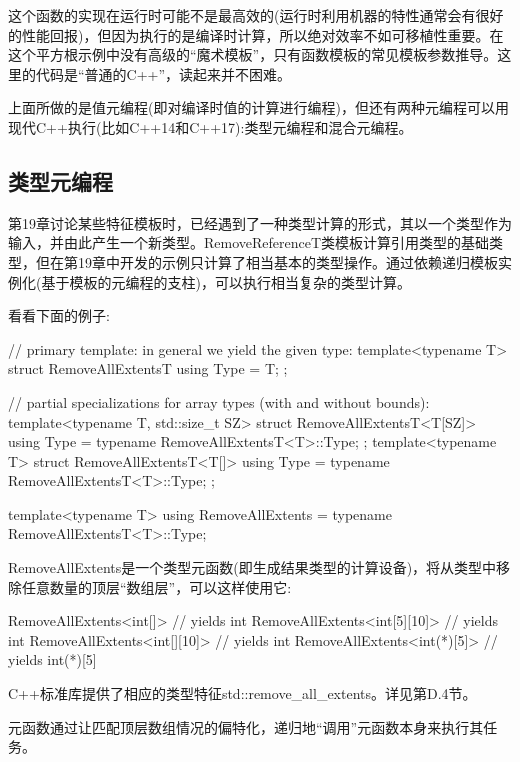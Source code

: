 这个函数的实现在运行时可能不是最高效的(运行时利用机器的特性通常会有很好的性能回报)，但因为执行的是编译时计算，所以绝对效率不如可移植性重要。在这个平方根示例中没有高级的“魔术模板”，只有函数模板的常见模板参数推导。这里的代码是“普通的C++”，读起来并不困难。

上面所做的是值元编程(即对编译时值的计算进行编程)，但还有两种元编程可以用现代C++执行(比如C++14和C++17):类型元编程和混合元编程。

\subsection{类型元编程}

第19章讨论某些特征模板时，已经遇到了一种类型计算的形式，其以一个类型作为输入，并由此产生一个新类型。RemoveReferenceT类模板计算引用类型的基础类型，但在第19章中开发的示例只计算了相当基本的类型操作。通过依赖递归模板实例化(基于模板的元编程的支柱)，可以执行相当复杂的类型计算。

看看下面的例子:

\begin{cpp}
// primary template: in general we yield the given type:
template<typename T>
struct RemoveAllExtentsT {
	using Type = T;
};

// partial specializations for array types (with and without bounds):
template<typename T, std::size_t SZ>
struct RemoveAllExtentsT<T[SZ]> {
	using Type = typename RemoveAllExtentsT<T>::Type;
};
template<typename T>
struct RemoveAllExtentsT<T[]> {
	using Type = typename RemoveAllExtentsT<T>::Type;
};

template<typename T>
using RemoveAllExtents = typename RemoveAllExtentsT<T>::Type;
\end{cpp}

RemoveAllExtents是一个类型元函数(即生成结果类型的计算设备)，将从类型中移除任意数量的顶层“数组层”，可以这样使用它:

\begin{cpp}
RemoveAllExtents<int[]> // yields int
RemoveAllExtents<int[5][10]> // yields int
RemoveAllExtents<int[][10]> // yields int
RemoveAllExtents<int(*)[5]> // yields int(*)[5]
\end{cpp}

\begin{notice}
C++标准库提供了相应的类型特征std::remove\_all\_extents。详见第D.4节。
\end{notice}

元函数通过让匹配顶层数组情况的偏特化，递归地“调用”元函数本身来执行其任务。

